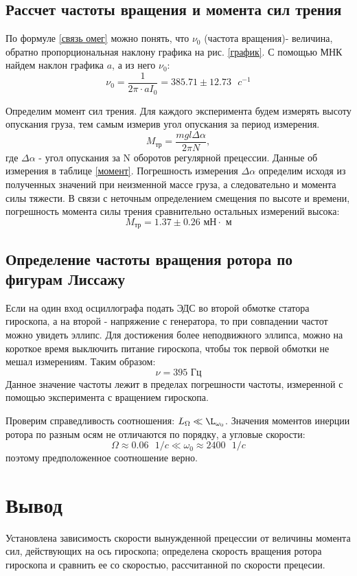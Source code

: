\documentclass[a4paper,12pt]{article} %
\begin{document}
\subsection{Рассчет частоты вращения и момента сил трения}
По формуле \ref{связь омег} можно понять, что $\nu_0$ (частота вращения)- величина, обратно пропорциональная наклону графика на рис. \ref{график}.
С помощью МНК найдем наклон графика $a$, а из него $\nu_0$:
\[\nu_0 = \frac{1}{2\pi\cdot aI_0} =385.71   \pm  12.73\text{ }c^{-1}\]

Определим момент сил трения. Для каждого эксперимента будем измерять высоту опускания груза, тем самым измерив угол опускания за период измерения.
\begin{equation}
M_\text{тр} = \frac{mgl\Delta\alpha}{2\pi N},
\end{equation}
где $\Delta\alpha$ - угол опускания за N оборотов регулярной прецессии.
Данные об измерения в таблице \ref{момент}. Погрешность измерения $\Delta\alpha$ определим исходя из полученных значений при неизменной массе груза, а следовательно и момента силы тяжести. В связи с неточным определением смещения по высоте и времени, погрешность момента силы трения сравнительно остальных измерений высока:
\begin{equation}
M_\text{тр} = 1.37 \pm 0.26 \text{ мН} \cdot \text{ м}
\end{equation}

\subsection{Определение частоты вращения ротора по фигурам Лиссажу}
Если на один вход осциллографа подать ЭДС во второй обмотке статора гироскопа, а на второй - напряжение с генератора, то при совпадении частот можно увидеть эллипс.
Для достижения более неподвижного эллипса, можно на короткое время выключить питание гироскопа, чтобы ток первой обмотки не мешал измерениям. Таким образом:
\begin{equation}
\nu = 395 \text{ Гц}
\end{equation}
Данное значение частоты лежит в пределах погрешности частоты, измеренной с помощью эксперимента с вращением гироскопа.

Проверим справедливость соотношения: $L_\Omega \ll \L_{\omega_0}$. Значения моментов инерции ротора по разным осям не отличаются по порядку, а угловые скорости:
\[\Omega \approx 0.06 \text{ } 1/c \ll \omega_0 \approx 2400 \text{  }1/c\]
поэтому предположенное соотношение верно.

\section{Вывод}
Установлена зависимость скорости вынужденной прецессии от величины момента сил, действующих на ось гироскопа; определена скорость вращения ротора гироскопа и сравнить ее со скоростью, рассчитанной по скорости прецесии.
\end{document}
